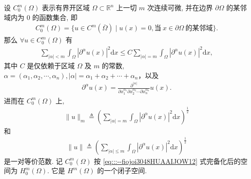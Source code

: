 \documentclass[../../main.tex]{subfiles}%
\begin{document}
\begin{lemma}[Poincaré不等式]\label{lemma:(庞加莱)Poincaré不等式}
设 $C_0^m(\Omega)$ 表示有界开区域 $\Omega\subset\mathbb{R}^n$ 上一切 $m$ 次连续可微, 并在边界 $\partial\Omega$ 的某邻域内为 $0$ 的函数集合, 即
\begin{align*}
C_0^m(\Omega)=\{u\in C^m(\overline{\Omega})\mid u(x)=0,\text{当}\ x\in\partial\Omega\ \text{的某邻域}\}.
\end{align*}
那么 $\forall u\in C_0^m(\Omega)$ 有
\begin{align}
\sum\limits_{|\alpha|<m}\int_\Omega |\partial^\alpha u(x)|^2\mathrm{d}x\leqslant C\sum\limits_{|\alpha|=m}\int_\Omega |\partial^\alpha u(x)|^2\mathrm{d}x,\label{eq:::--fiojoi3048HUAAIJOW9}
\end{align}
其中 $C$ 是仅依赖于区域 $\Omega$ 及 $m$ 的常数,$\alpha = (\alpha_1,\alpha_2,\cdots,\alpha_n), |\alpha| = \alpha_1+\alpha_2+\cdots+\alpha_n$，以及
\begin{align*}
\partial^\alpha u(x) = \frac{\partial^{|\alpha|}}{\partial x_1^{\alpha_1} \partial x_2^{\alpha_2} \cdots \partial x_n^{\alpha_n}} u(x).
\end{align*}
进而在 $C_0^m(\Omega)$ 上,
\begin{align}
\|u\|_m\triangleq\left(\sum\limits_{|\alpha|=m}\int_\Omega |\partial^\alpha u(x)|^2\mathrm{d}x\right)^\frac{1}{2}\label{eq:::--fiojoi3048HUAAIJOW12}
\end{align}
和
\begin{align*}
\|u\|\triangleq\left(\sum\limits_{|\alpha|\leqslant m}\int_\Omega |\partial^\alpha u(x)|^2\mathrm{d}x\right)^\frac{1}{2}
\end{align*}
是一对等价范数. 记 $C_0^m(\Omega)$ 按 \eqref{eq:::--fiojoi3048HUAAIJOW12} 式完备化后的空间为 $H_0^m(\Omega)$. 它是 $H^m(\Omega)$ 的一个闭子空间.
\end{lemma}
\end{document}
